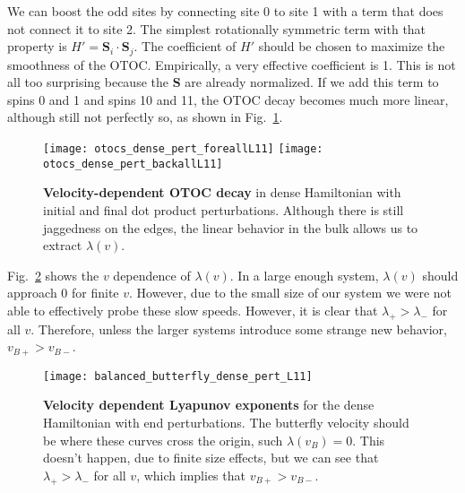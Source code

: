 We can boost the odd sites by connecting site 0 to site 1 with a term that does not connect it to site 2. The simplest rotationally symmetric term with that property is $H'=\bm{S}_i\cdot\bm{S}_j$. The coefficient of $H'$ should be chosen to maximize the smoothness of the OTOC. Empirically, a very effective coefficient is 1. This is not all too surprising because the $\bm S$ are already normalized. If we add this term to spins 0 and 1 and spins 10 and 11, the OTOC decay becomes much more linear, although still not perfectly so, as shown in Fig.~\ref{fig:otocs_pert}.
\begin{figure}
	\centering
	\texttt{[image: otocs\_dense\_pert\_foreallL11]}
	\texttt{[image: otocs\_dense\_pert\_backallL11]}
	\caption{\textbf{Velocity-dependent OTOC decay} in dense Hamiltonian with initial and final dot product perturbations. Although there is still jaggedness on the edges, the linear behavior in the bulk allows us to extract $\lambda(v)$.}
	\label{fig:otocs_pert}
\end{figure}

Fig.~\ref{fig:balanced_butterfly_dense_pert_L11} shows the $v$ dependence of $\lambda(v)$. In a large enough system, $\lambda(v)$ should approach 0 for finite $v$. However, due to the small size of our system we were not able to effectively probe these slow speeds. However, it is clear that $\lambda_+>\lambda_-$ for all $v$. Therefore, unless the larger systems introduce some strange new behavior, $v_{B+}>v_{B-}$.
\begin{figure}
	\centering
	\texttt{[image: balanced\_butterfly\_dense\_pert\_L11]}
	\caption{\textbf{Velocity dependent Lyapunov exponents} for the dense Hamiltonian with end perturbations. The butterfly velocity should be where these curves cross the origin, such $\lambda(v_B) = 0$. This doesn't happen, due to finite size effects, but we can see that $\lambda_+>\lambda_-$ for all $v$, which implies that $v_{B+}>v_{B-}$.}
	\label{fig:balanced_butterfly_dense_pert_L11}
\end{figure}